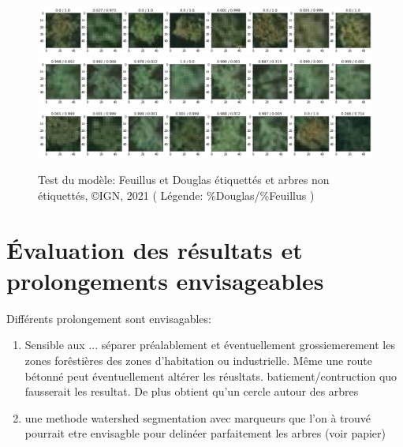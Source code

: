 \documentclass{beamer}
\begin{document}
\begin{frame}
	\begin{figure}
		\includegraphics[scale=0.3]{res3.png}
		\includegraphics[scale=0.3]{res4.png}
		\includegraphics[scale=0.3]{res5.png}
		\caption{Test du modèle: Feuillus et Douglas étiquettés et arbres non étiquettés, \copyright IGN, 2021 ( Légende: \%Douglas/\%Feuillus )}
	\end{figure}
\end{frame}

\section{\'{E}valuation des résultats et prolongements envisageables}

\begin{frame}
	Différents prolongement sont envisagables: 
	\begin{enumerate}
	\item Sensible aux ... séparer préalablement et éventuellement grossiemerement les zones forêstières des zones d'habitation ou  industrielle. Même une route bétonné peut éventuellement altérer les réusltats. batiement/contruction quo fausserait les resultat. 
	De plus obtient qu'un cercle autour des arbres
	\item une methode watershed segmentation avec marqueurs que l'on à trouvé pourrait etre envisagble pour delinéer parfaitement les arbres (voir papier) 
	\end{enumerate}
\end{frame}
\end{document}

